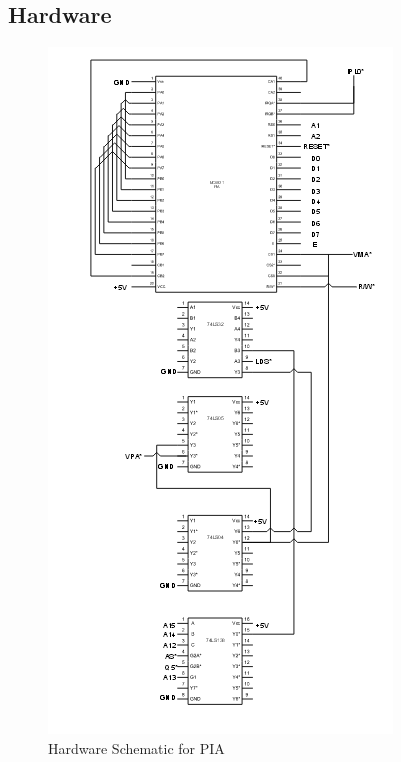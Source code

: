 \documentclass[12pt,Letter]{article}
\begin{document}
\subsection{Hardware}\label{sec:hardware}
\begin{figure}
\centering
\includegraphics[width=.8\linewidth]{schematic}
\caption{Hardware Schematic for PIA}
\label{fig:schematic}
\end{figure}
\end{document}
